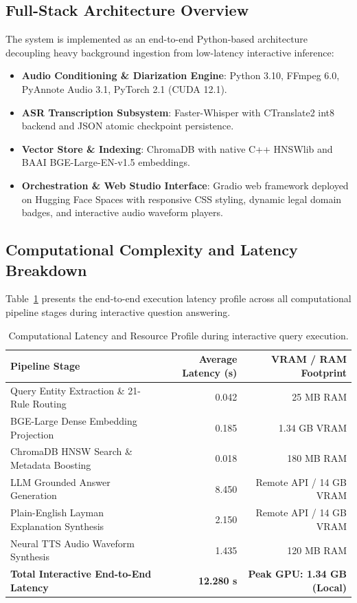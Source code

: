 \documentclass{llncs}
\begin{document}
\subsection{Full-Stack Architecture Overview}
The system is implemented as an end-to-end Python-based architecture decoupling heavy background ingestion from low-latency interactive inference:
\begin{itemize}
    \item \textbf{Audio Conditioning \& Diarization Engine}: Python 3.10, FFmpeg 6.0, PyAnnote Audio 3.1, PyTorch 2.1 (CUDA 12.1).
    \item \textbf{ASR Transcription Subsystem}: Faster-Whisper with CTranslate2 int8 backend and JSON atomic checkpoint persistence.
    \item \textbf{Vector Store \& Indexing}: ChromaDB with native C++ HNSWlib and BAAI BGE-Large-EN-v1.5 embeddings.
    \item \textbf{Orchestration \& Web Studio Interface}: Gradio web framework deployed on Hugging Face Spaces with responsive CSS styling, dynamic legal domain badges, and interactive audio waveform players.
\end{itemize}

\subsection{Computational Complexity and Latency Breakdown}
Table~\ref{tab:latency_breakdown} presents the end-to-end execution latency profile across all computational pipeline stages during interactive question answering.

\begin{table}[htbp]
\caption{Computational Latency and Resource Profile during interactive query execution.}
\label{tab:latency_breakdown}
\centering
\small
\begin{tabular}{lrr}
\toprule
\textbf{Pipeline Stage} & \textbf{Average Latency (s)} & \textbf{VRAM / RAM Footprint} \\
\midrule
Query Entity Extraction \& 21-Rule Routing & 0.042 & 25 MB RAM \\
BGE-Large Dense Embedding Projection & 0.185 & 1.34 GB VRAM \\
ChromaDB HNSW Search \& Metadata Boosting & 0.018 & 180 MB RAM \\
LLM Grounded Answer Generation & 8.450 & Remote API / 14 GB VRAM \\
Plain-English Layman Explanation Synthesis & 2.150 & Remote API / 14 GB VRAM \\
Neural TTS Audio Waveform Synthesis & 1.435 & 120 MB RAM \\
\midrule
\textbf{Total Interactive End-to-End Latency} & \textbf{12.280 s} & \textbf{Peak GPU: 1.34 GB (Local)} \\
\bottomrule
\end{tabular}
\end{table}
\end{document}
